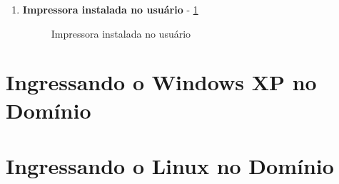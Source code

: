 \begin{enumerate}
	\item \textbf{Impressora instalada no usuário} - \ref{impressora_compartilhada}
	\begin{figure}[ht]
	   	\centering
	   	\caption{Impressora instalada no usuário}
	    \label{impressora_compartilhada}
	\end{figure}
	
\end{enumerate}

\section{Ingressando o Windows XP no Domínio}

\section{Ingressando o Linux no Domínio}
